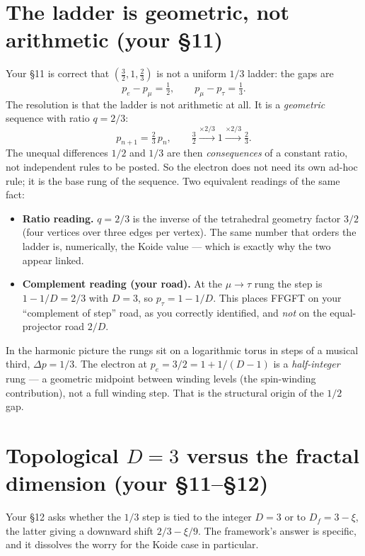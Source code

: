 \section{The ladder is geometric, not arithmetic (your \S11)}

Your \S11 is correct that $\left(\tfrac{3}{2}, 1, \tfrac{2}{3}\right)$ is
not a uniform $1/3$ ladder: the gaps are
\[
  p_e - p_\mu = \tfrac{1}{2}, \qquad p_\mu - p_\tau = \tfrac{1}{3}.
\]
The resolution is that the ladder is not arithmetic at all. It is a
\emph{geometric} sequence with ratio $q = 2/3$:
\[
  p_{n+1} = \tfrac{2}{3}\,p_n,
  \qquad
  \tfrac{3}{2} \xrightarrow{\times 2/3} 1 \xrightarrow{\times 2/3} \tfrac{2}{3}.
\]
The unequal differences $1/2$ and $1/3$ are then \emph{consequences} of a
constant ratio, not independent rules to be posted. So the electron does
not need its own ad-hoc rule; it is the base rung of the sequence. Two
equivalent readings of the same fact:

\begin{itemize}
  \item \textbf{Ratio reading.} $q = 2/3$ is the inverse of the
        tetrahedral geometry factor $3/2$ (four vertices over three edges
        per vertex). The same number that orders the ladder is, numerically,
        the Koide value --- which is exactly why the two appear linked.
  \item \textbf{Complement reading (your road).} At the $\mu\!\to\!\tau$
        rung the step is $1 - 1/D = 2/3$ with $D = 3$, so
        $p_\tau = 1 - 1/D$. This places FFGFT on your ``complement of
        step'' road, as you correctly identified, and \emph{not} on the
        equal-projector road $2/D$.
\end{itemize}

In the harmonic picture the rungs sit on a logarithmic torus in steps of a
musical third, $\Delta p = 1/3$. The electron at $p_e = 3/2 = 1 + 1/(D-1)$
is a \emph{half-integer} rung --- a geometric midpoint between winding
levels (the spin-winding contribution), not a full winding step. That is
the structural origin of the $1/2$ gap.

\section{Topological $D=3$ versus the fractal dimension (your \S11--\S12)}

Your \S12 asks whether the $1/3$ step is tied to the integer $D=3$ or to
$D_f = 3-\xi$, the latter giving a downward shift $2/3 - \xi/9$. The
framework's answer is specific, and it dissolves the worry for the Koide
case in particular.

